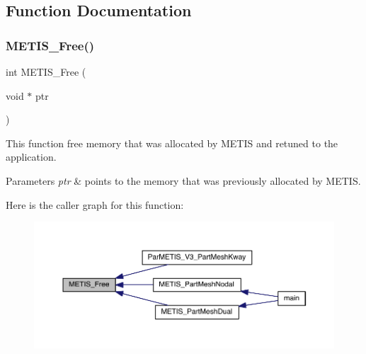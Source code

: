 \subsection{Function Documentation}
\mbox{\label{a00170_a8b3f46b67d6ec9fccaa8c72b9ad10b71}} 
\subsubsection{\texorpdfstring{M\+E\+T\+I\+S\+\_\+\+Free()}{METIS\_Free()}}
{\footnotesize\ttfamily int M\+E\+T\+I\+S\+\_\+\+Free (\begin{DoxyParamCaption}\item[{void $\ast$}]{ptr }\end{DoxyParamCaption})}

This function free memory that was allocated by M\+E\+T\+IS and retuned to the application.


\begin{DoxyParams}{Parameters}
{\em ptr} & points to the memory that was previously allocated by M\+E\+T\+IS. \\
\hline
\end{DoxyParams}
Here is the caller graph for this function\+:\nopagebreak
\begin{figure}[H]
\begin{center}
\leavevmode
\includegraphics[width=350pt]{a00170_a8b3f46b67d6ec9fccaa8c72b9ad10b71_icgraph}
\end{center}
\end{figure}
\mbox{\label{a00170_abea67bb0c6286795ac5fc9bee605dc5d}} 
